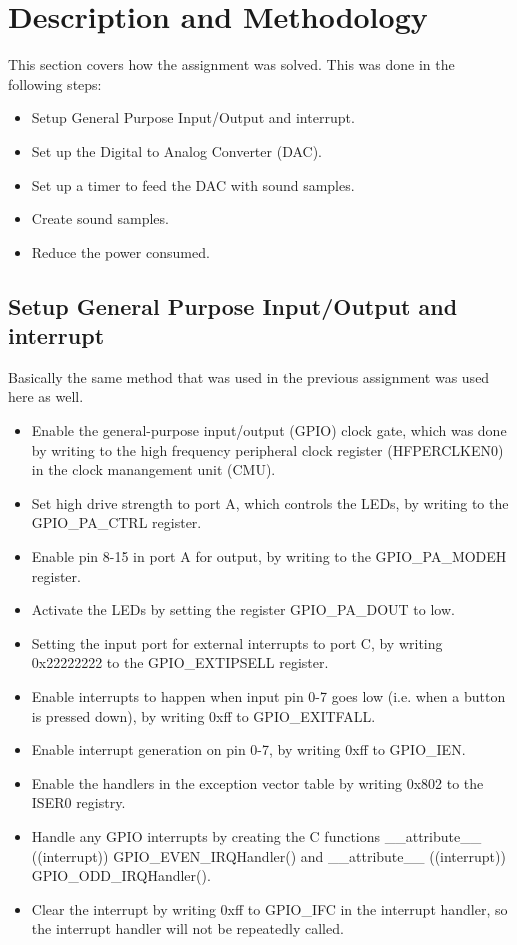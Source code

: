 \section{Description and Methodology}\label{chapter:Description and Methodology}
This section covers how the assignment was solved. This was done in the following steps:

\begin{itemize}
	\item Setup General Purpose Input/Output and interrupt.  
	\item Set up the Digital to Analog Converter (DAC).
	\item Set up a timer to feed the DAC with sound samples. 
	\item Create sound samples. 
	\item Reduce the power consumed. 
\end{itemize}


\subsection{Setup General Purpose Input/Output and interrupt}

Basically the same method that was used in the previous assignment was used here as well. 

\begin{itemize}
 	\item 	Enable the general-purpose input/output (GPIO) clock gate, which was done by writing to the high frequency peripheral clock register (HFPERCLKEN0) in the clock manangement unit (CMU). 
 	\item 	Set high drive strength to port A, which controls the LEDs, by writing to the GPIO\_PA\_CTRL register.
 	\item 	Enable pin 8-15 in port A for output, by writing to the GPIO\_PA\_MODEH register.
 	\item 	Activate the LEDs by setting the register GPIO\_PA\_DOUT to low. 
 	\item Setting the input port for external interrupts to port C, by writing 0x22222222 to the GPIO\_EXTIPSELL register. 
	\item Enable interrupts to happen when input pin 0-7 goes low (i.e. when a button is pressed down), by writing 0xff to GPIO\_EXITFALL. 
	\item Enable interrupt generation on pin 0-7, by writing 0xff to GPIO\_IEN.
	\item Enable the handlers in the exception vector table by writing 0x802 to the ISER0 registry.
	\item Handle any GPIO interrupts by creating the C functions \_\_attribute\_\_ ((interrupt)) GPIO\_EVEN\_IRQHandler() and \_\_attribute\_\_ ((interrupt)) GPIO\_ODD\_IRQHandler().
	\item Clear the interrupt by writing 0xff to GPIO\_IFC in the interrupt handler, so the interrupt handler will not be repeatedly called.
\end{itemize}

